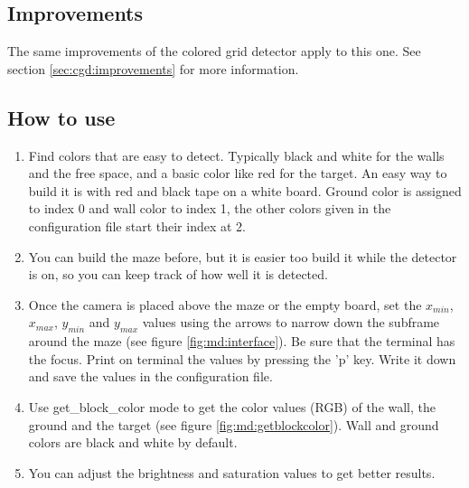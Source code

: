 \subsection{Improvements}
\label{sec:md:improvements}

The same improvements of the colored grid detector apply to this one. 
See section \ref{sec:cgd:improvements} for more information.

\subsection{How to use}
\label{sec:md:howto}
    \begin{enumerate}
        \item Find colors that are easy to detect. Typically black and 
            white for the walls and the free space, and a basic color 
            like red for the target. An easy way to build it is with 
            red and black tape on a white board. Ground color is assigned
            to index 0 and wall color to index 1, the other colors given
            in the configuration file start their index at 2.
        \item You can build the maze before, but it is easier too build 
            it while the detector is on, so you can keep track of how 
            well it is detected.
        \item Once the camera is placed above the maze or the empty board, 
            set the $x_{min}$, $x_{max}$, $y_{min}$ and $y_{max}$
            values using the arrows to narrow 
            down the subframe around the maze
            (see figure \ref{fig:md:interface}). Be sure that the terminal 
            has the focus. Print on terminal the values by pressing
            the 'p' key. Write it down and 
            save the values in the configuration file.
        \item Use get\_block\_color mode to get the color values (RGB) 
            of the wall, the ground and the target (see 
            figure \ref{fig:md:getblockcolor}). Wall and ground 
            colors are black and white by default.
        \item You can adjust the brightness and saturation values to 
            get better results.
    \end{enumerate}

